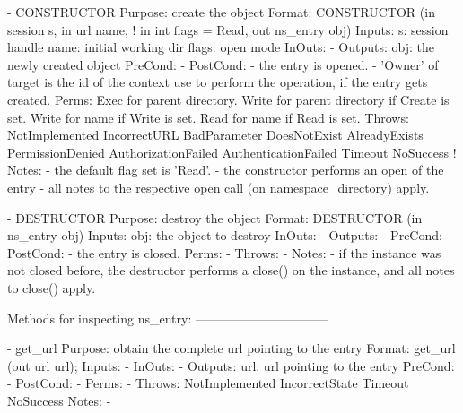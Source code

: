  
 \begin{myspec}
    - CONSTRUCTOR
      Purpose:  create the object
      Format:   CONSTRUCTOR          (in  session   s, 
                                      in  url       name,
!                                     in  int       flags = Read,
                                      out ns_entry obj)
      Inputs:   s:                    session handle
                name:                 initial working dir
                flags:                open mode
      InOuts:   -
      Outputs:  obj:                  the newly created object
      PreCond:  -
      PostCond: - the entry is opened.
                - 'Owner' of target is the id of the context
                  use to perform the operation, if the entry 
                  gets created.
      Perms:    Exec  for parent directory.
                Write for parent directory if Create is set.
                Write for name if Write is set.
                Read  for name if Read  is set.
      Throws:   NotImplemented
                IncorrectURL
                BadParameter
                DoesNotExist
                AlreadyExists
                PermissionDenied
                AuthorizationFailed
                AuthenticationFailed
                Timeout
                NoSuccess
!     Notes:    - the default flag set is 'Read'.
                - the constructor performs an open of the 
                  entry - all notes to the respective open 
                  call (on namespace_directory) apply.
 
 
    - DESTRUCTOR
      Purpose:  destroy the object
      Format:   DESTRUCTOR           (in  ns_entry     obj)
      Inputs:   obj:                  the object to destroy
      InOuts:   -
      Outputs:  -
      PreCond:  -
      PostCond: - the entry is closed.
      Perms:    -
      Throws:   - 
      Notes:    - if the instance was not closed before, the 
                  destructor performs a close() on the instance,
                  and all notes to close() apply.
 
 
 
    Methods for inspecting ns_entry:
    --------------------------------
 
    - get_url
      Purpose:  obtain the complete url pointing to the entry
      Format:   get_url            (out  url       url);
      Inputs:   -
      InOuts:   -
      Outputs:  url:                url pointing to the entry
      PreCond:  -
      PostCond: -
      Perms:    -
      Throws:   NotImplemented
                IncorrectState
                Timeout
                NoSuccess
      Notes:    -
 

\end{myspec}
